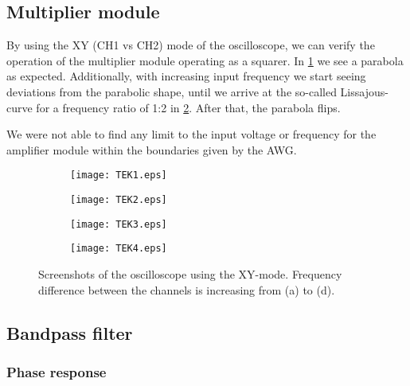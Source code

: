 \subsection{Multiplier module}

By using the XY (CH1 vs CH2) mode of the oscilloscope, we can verify the operation of the multiplier module operating as a squarer. In \cref{fig:amplifier-base} we see a parabola as expected. Additionally, with increasing input frequency we start seeing deviations from the parabolic shape, until we arrive at the so-called Lissajous-curve for a frequency ratio of 1:2 in \cref{fig:amplifier-lissajous}. After that, the parabola flips.

We were not able to find any limit to the input voltage or frequency for the amplifier module within the boundaries given by the AWG.

\begin{figure}[H]
	\centering
	\begin{subfigure}{0.49\textwidth}
		\centering
		\texttt{[image: TEK1.eps]}
		\caption{}
		\label{fig:amplifier-base}
	\end{subfigure}
	\begin{subfigure}{0.49\textwidth}
		\centering
		\texttt{[image: TEK2.eps]}
		\caption{}
	\end{subfigure}
	\begin{subfigure}{0.49\textwidth}
		\centering
		\texttt{[image: TEK3.eps]}
		\caption{}
		\label{fig:amplifier-lissajous}
	\end{subfigure}
	\begin{subfigure}{0.49\textwidth}
		\centering
		\texttt{[image: TEK4.eps]}
		\caption{}
	\end{subfigure}
	
	\caption{Screenshots of the oscilloscope using the XY-mode. Frequency difference between the channels is increasing from (a) to (d).}
	\label{fig:xy}
\end{figure}


\subsection{Bandpass filter}
\subsubsection{Phase response}

